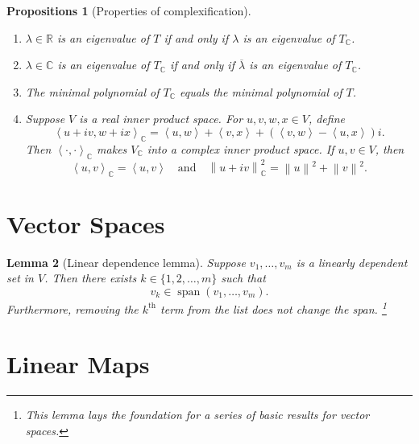 \documentclass{tufte-handout}
\theoremstyle{plain} %
\newtheorem{thm}{Theorem}
\newtheorem{props}[thm]{Propositions}
\newtheorem{lem}[thm]{Lemma}
\theoremstyle{definition}
\theoremstyle{remark}
\newcommand{\norm}[1]{\left\lVert#1\right\rVert}
\newcommand{\inp}[2]{\left\langle#1,#2\right\rangle}
\newcommand{\R}{\mathbb{R}}
\newcommand{\C}{\mathbb{C}}
\newcommand{\B}{\mathcal{B}}
\DeclareMathOperator{\spn}{span}
\begin{document}
\begin{props}[Properties of complexification]
	\begin{enumerate}
		\item $\lambda\in\R$ is an eigenvalue of $T$ if and only if $\lambda$ is an eigenvalue of $T_\C$.
		\item $\lambda\in\C$ is an eigenvalue of $T_\C$ if and only if $\overline{\lambda}$ is an eigenvalue of $T_\C$.
		\item The minimal polynomial of $T_\C$ equals the minimal polynomial of $T$.
		\item Suppose $V$ is a real inner product space. For $u,v,w,x\in V$, define
		\[\inp{u+iv}{w+ix}_\C=\inp{u}{w}+\inp{v}{x}+(\inp{v}{w}-\inp{u}{x})i.\]
		Then $\inp{\cdot}{\cdot}_\C$ makes $V_\C$ into a complex inner product space. If $u,v\in V$, then
		\[\inp{u}{v}_\C=\inp{u}{v}\quad\text{and}\quad\norm{u+iv}_\C^2=\norm{u}^2+\norm{v}^2.\]
	\end{enumerate}
\end{props}


\section{Vector Spaces}
\begin{lem}[Linear dependence lemma]
	Suppose $v_1,\dots,v_m$ is a linearly dependent set in $V$. Then there exists $k\in\{1,2,\dots,m\}$ such that
	\[v_k\in\spn(v_1,\dots,v_m).\]
	Furthermore, removing the $k^\text{th}$ term from the list does not change the span.%
	\footnote{This lemma lays the foundation for a series of basic results for vector spaces.}
\end{lem}



\section{Linear Maps}
\end{document}
